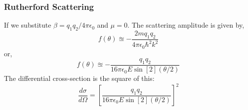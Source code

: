 \subsubsection{Rutherford Scattering}
If we substitute $\beta = q_{1}q_{2}/ 4 \pi \epsilon_{0}$ and $\mu = 0$. The scattering amplitude is given by,
\begin{equation}
f(\theta) \approxeq - \frac{2m q_{1}q_{2}}{4 \pi \epsilon_{0} \hbar^{2} k^{2}}
\end{equation}
or,
\begin{equation}
f(\theta) \approxeq - \frac{q_{1}q_{2}}{16 \pi \epsilon_{0} E \sin[2](\theta / 2)}
\end{equation}
The differential cross-section is the square of this:
\begin{equation}
	\frac{d \sigma}{d \Omega} = \left[\frac{q_{1}q_{2}}{16 \pi \epsilon_{0} E \sin[2](\theta / 2)} \right]^{2}
\end{equation}
